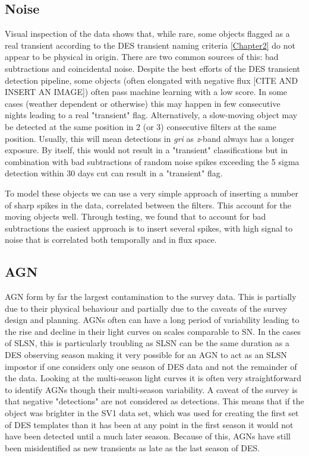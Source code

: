 \subsection{Noise}
Visual inspection of the data shows that, while rare, some objects flagged as a real transient according to the DES transient naming criteria \cref{Chapter2} do not appear to be physical in origin. There are two common sources of this: bad subtractions and coincidental noise. Despite the best efforts of the DES transient detection pipeline, some objects (often elongated with negative flux [CITE AND INSERT AN IMAGE]) often pass machine learning with a low score. In some cases (weather dependent or otherwise) this may happen in few consecutive nights leading to a real "transient" flag. Alternatively, a slow-moving object may be detected at the same position in 2 (or 3) consecutive filters at the same position. Usually, this will mean detections in \textit{gri} as \textit{z}-band always has a longer exposure. By itself, this would not result in a "transient" classifications but in combination with bad subtractions of random noise spikes exceeding the 5 sigma detection within 30 days cut can result in a "transient" flag.

To model these objects we can use a very simple approach of inserting a number of sharp spikes in the data, correlated between the filters. This account for the moving objects well. Through testing, we found that to account for bad subtractions the easiest approach is to insert several spikes, with high signal to noise that is correlated both temporally and in flux space.

\subsection{AGN}
AGN form by far the largest contamination to the survey data. This is partially due to their physical behaviour and partially due to the caveats of the survey design and planning. AGNs often can have a long period of variability leading to the rise and decline in their light curves on scales comparable to SN. In the cases of SLSN, this is particularly troubling as SLSN can be the same duration as a DES observing season making it very possible for an AGN to act as an SLSN impostor if one considers only one season of DES data and not the remainder of the data. Looking at the multi-season light curves it is often very straightforward to identify AGNs though their multi-season variability. A caveat of the survey is that negative "detections" are not considered as detections. This means that if the object was brighter in the SV1 data set, which was used for creating the first set of DES templates than it has been at any point in the first season it would not have been detected until a much later season. Because of this, AGNs have still been misidentified as new transients as late as the last season of DES.

